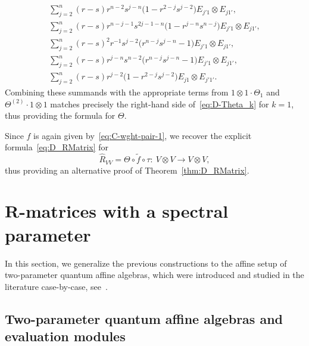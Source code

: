 \documentclass[pdftex]{sigma}
\numberwithin{equation}{section}
\begin{document}
\begin{gather*}
 \sum_{j = 2}^{n}(r - s)r^{n - 2}s^{j - n}\bigl(1 - r^{2-j}s^{j - 2}\bigr)E_{j'1} \otimes E_{j1'},
\\
 \sum_{j = 2}^{n}(r-s)r^{n- j- 1}s^{2j - 1 - n}\bigl(1 - r^{j-n}s^{n - j}\bigr)E_{j'1} \otimes E_{j1'},
\\
 \sum_{j = 2}^{n}(r - s)^{2}r^{-1}s^{j - 2}\bigl(r^{n - j}s^{j - n} - 1\bigr)E_{j'1} \otimes E_{j1'},
\\
 \sum_{j = 2}^{n}(r - s)r^{j - n}s^{n - 2}\bigl(r^{n-j}s^{j - n} - 1\bigr)E_{j'1} \otimes E_{j1'},
\\
 \sum_{j = 2}^{n}(r - s)r^{j - 2}\bigl(1 - r^{2 - j}s^{j - 2}\bigr)E_{j1} \otimes E_{j'1'}.
\end{gather*}
Combining these summands with the appropriate terms from $1 \otimes 1 \cdot \Theta_{1}$ and $\Theta^{(2)}\cdot 1\otimes 1$ matches precisely the right-hand side of~\eqref{eq:D-Theta_k} for $k=1$, thus providing the formula for $\Theta$.

Since $f$ is again given by~\eqref{eq:C-wght-pair-1}, we recover the explicit formula~\eqref{eq:D_RMatrix} for
\[
\hat{R}_{VV}=\Theta \circ \widetilde{f} \circ \tau\colon \ V \otimes V \to V \otimes V,
\]
 thus providing an alternative proof of Theorem~\ref{thm:D_RMatrix}.

\section[R-matrices with a spectral parameter]{$\boldsymbol{R}$-matrices with a spectral parameter}\label{sec:affine-R}

In this section, we generalize the previous constructions to the affine setup of two-parameter quantum affine algebras, which were introduced and studied in the literature case-by-case, see~\cite{GHZ, HRZ,HZ2,HZ1}.

\subsection{Two-parameter quantum affine algebras and evaluation modules}\label{ssec:2-param affine}
\end{document}
